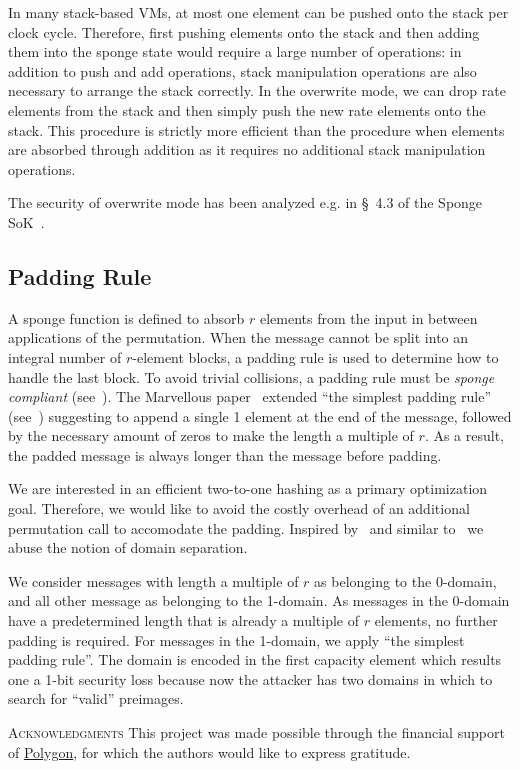 \documentclass[a4paper]{article}
\begin{document}
In many stack-based VMs, at most one element can be pushed onto the stack per clock cycle. Therefore, first pushing elements onto the stack and then adding them into the sponge state would require a large number of operations: in addition to push and add operations, stack manipulation operations are also necessary to arrange the stack correctly. In the overwrite mode, we can drop rate elements from the stack and then simply push the new rate elements onto the stack. This procedure is strictly more efficient than the procedure when elements are absorbed through addition as it requires no additional stack manipulation operations.

The security of overwrite mode has been analyzed e.g. in \S~4.3 of the Sponge SoK~\cite{sponge}.

\subsection{Padding Rule}
A sponge function is defined to absorb $r$ elements from the input in between applications of the permutation. When the message cannot be split into an integral number of $r$-element blocks, a padding rule is used to determine how to handle the last block. To avoid trivial collisions, a padding rule must be {\it sponge compliant} (see~\cite[Def.~1]{sponge}). The Marvellous paper~\cite{cryptoeprint:2019/426} extended ``the simplest padding rule'' (see~\cite[Def.~2]{sponge}) suggesting to append a single 1 element at the end of the message, followed by the necessary amount of zeros to make the length a multiple of $r$. As a result, the padded message is always longer than the message before padding.

We are interested in an efficient two-to-one hashing as a primary optimization goal. Therefore, we would like to avoid the costly overhead of an additional permutation call to accomodate the padding. Inspired by~\cite{DBLP:journals/cryptography/Hirose18} and similar to~\cite{DBLP:journals/iacr/BouvierBCPV22} we abuse the notion of domain separation. 

We consider messages with length a multiple of $r$ as belonging to the 0-domain, and all other message as belonging to the 1-domain. As messages in the 0-domain have a predetermined length that is already a multiple of $r$ elements, no further padding is required. For messages in the 1-domain, we apply ``the simplest padding rule''. The domain is encoded in the first capacity element which results one a 1-bit security loss because now the attacker has two domains in which to search for ``valid'' preimages. 


\vspace{0.25cm}
\textsc{Acknowledgments} This project was made possible through the financial support of \href{https://polygon.technology/}{Polygon}, for which the authors would like to express gratitude.




\end{document}
